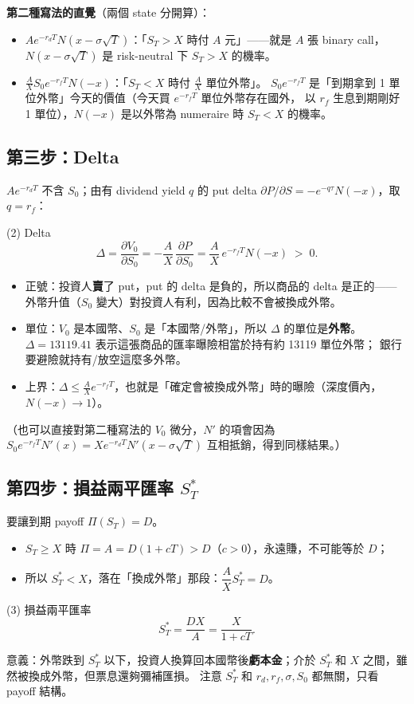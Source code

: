 \documentclass[11pt,a4paper]{article}
\begin{document}
\textbf{第二種寫法的直覺}（兩個 state 分開算）：
\begin{itemize}
  \item $Ae^{-r_dT}N(x-\sigma\sqrt T)$：「$S_T>X$ 時付 $A$ 元」——就是 $A$ 張 binary call，
        $N(x-\sigma\sqrt T)$ 是 risk-neutral 下 $S_T>X$ 的機率。
  \item $\frac AX S_0e^{-r_fT}N(-x)$：「$S_T<X$ 時付 $\frac AX$ 單位外幣」。
        $S_0e^{-r_fT}$ 是「到期拿到 1 單位外幣」今天的價值（今天買 $e^{-r_fT}$ 單位外幣存在國外，
        以 $r_f$ 生息到期剛好 1 單位），$N(-x)$ 是以外幣為 numeraire 時 $S_T<X$ 的機率。
\end{itemize}

\subsection{第三步：Delta}

$Ae^{-r_dT}$ 不含 $S_0$；由有 dividend yield $q$ 的 put delta $\partial P/\partial S=-e^{-q\tau}N(-x)$，取 $q=r_f$：
\begin{keybox}{(2) Delta}
\[
  \Delta=\frac{\partial V_0}{\partial S_0}
        =-\frac{A}{X}\,\frac{\partial P}{\partial S_0}
        =\frac{A}{X}\,e^{-r_fT}N(-x)\;>\;0.
\]
\end{keybox}
\begin{itemize}[nosep]
  \item 正號：投資人\textbf{賣}了 put，put 的 delta 是負的，所以商品的 delta 是正的——
        外幣升值（$S_0$ 變大）對投資人有利，因為比較不會被換成外幣。
  \item 單位：$V_0$ 是本國幣、$S_0$ 是「本國幣/外幣」，所以 $\Delta$ 的單位是\textbf{外幣}。
        $\Delta=13119.41$ 表示這張商品的匯率曝險相當於持有約 13119 單位外幣；
        銀行要避險就持有/放空這麼多外幣。
  \item 上界：$\Delta\le\frac AX e^{-r_fT}$，也就是「確定會被換成外幣」時的曝險（深度價內，$N(-x)\to1$）。
\end{itemize}
（也可以直接對第二種寫法的 $V_0$ 微分，$N'$ 的項會因為 $S_0e^{-r_fT}N'(x)=Xe^{-r_dT}N'(x-\sigma\sqrt T)$ 互相抵銷，得到同樣結果。）

\subsection{第四步：損益兩平匯率 $S_T^{*}$}

要讓到期 payoff $\Pi(S_T)=D$。
\begin{itemize}[nosep]
  \item $S_T\ge X$ 時 $\Pi=A=D(1+cT)>D$（$c>0$），永遠賺，不可能等於 $D$；
  \item 所以 $S_T^{*}<X$，落在「換成外幣」那段：$\dfrac{A}{X}S_T^{*}=D$。
\end{itemize}
\begin{keybox}{(3) 損益兩平匯率}
\[
  S_T^{*}=\frac{DX}{A}=\frac{X}{1+cT}.
\]
\end{keybox}
意義：外幣跌到 $S_T^{*}$ 以下，投資人換算回本國幣後\textbf{虧本金}；介於 $S_T^{*}$ 和 $X$ 之間，雖然被換成外幣，但票息還夠彌補匯損。
注意 $S_T^{*}$ 和 $r_d,r_f,\sigma,S_0$ 都無關，只看 payoff 結構。
\end{document}
